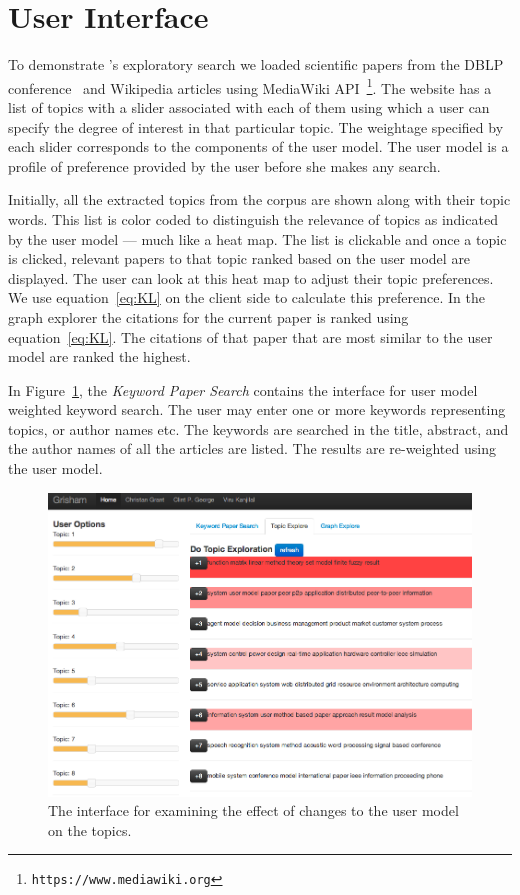 
\section{User Interface}
\label{sec:demo}


To demonstrate \system's exploratory search we loaded scientific 
papers from the DBLP conference~\cite{Tang:2008:EMA:1367497.1367722} 
and Wikipedia articles using MediaWiki API~\footnote{\texttt{https://www.mediawiki.org}}.
The {\system} website has a list of topics with a slider associated 
with each of them using which a user can specify the degree of 
interest in that particular topic. The weightage specified by each 
slider corresponds to the components of the user model. The user 
model is a profile of preference provided by the user before she 
makes any search.

Initially, all the extracted topics from the corpus are shown along with their topic words.
This list is color coded to distinguish the relevance of topics as indicated by the user model --- much like a heat map.
The list is clickable and once a topic is clicked, relevant papers to that topic ranked based on the user model are displayed.
The user can look at this heat map to adjust their topic preferences.
We use equation~\ref{eq:KL} on the client side to calculate this preference. 
In the graph explorer the citations for the current paper is ranked
using equation~\ref{eq:KL}. The citations of that paper that are most
similar to the user model are ranked the highest.


In Figure~\ref{fig:topic_exploration}, the \textsl{Keyword Paper 
Search} contains the interface for user model weighted keyword search.
The user may enter one or more keywords representing topics, or 
author names etc. The keywords are searched in the title, abstract, 
and the author names of all the articles are listed. The results are  
re-weighted using the user model. 

\begin{figure}[htb]\centering
\includegraphics[width=.45\textwidth]{images/topic_exploration.png} %
\caption{The interface for examining the effect of changes to the user model on the topics.}
\label{fig:topic_exploration}
\end{figure}

